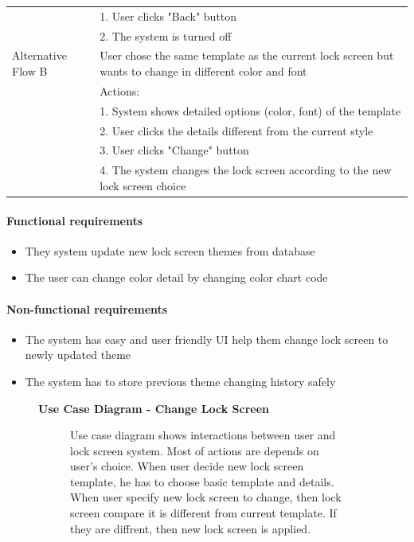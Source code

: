 \documentclass{article}
\begin{document}
\begin{table}[htbp]
\begin{tabularx}{\textwidth}{|>{\raggedright\arraybackslash}p{}|X|}
								 & 1. User clicks "Back" button \\
								 & 2. The system is turned off \\ \hline
				Alternative Flow B & User chose the same template as the current lock screen but wants to change in different color and font \\
								 & Actions: \\
								 & 1. System shows detailed options (color, font) of the template \\
								 & 2. User clicks the details different from the current style \\
								 & 3. User clicks "Change" button \\
								 & 4. The system changes the lock screen according to the new lock screen choice \\ \hline
			\end{tabularx}
		\end{table}
		\paragraph{Functional requirements}
		\begin{itemize}
			\item They system update new lock screen themes from database
			\item The user can change color detail by changing color chart code
		\end{itemize}
		
		\paragraph{Non-functional requirements}
		\begin{itemize}
			\item The system has easy and user friendly UI help them change lock screen to newly updated theme
			\item The system has to store previous theme changing history safely
		\end{itemize}
		\newpage
		
		\begin{figure}[htbp]
			\textbf{Use Case Diagram - Change Lock Screen}
			\centering
			\begin{subfigure}{\textwidth}
				\resizebox{\textwidth}{!}{}
			\end{subfigure}
			\begin{subfigure}{\textwidth}
				Use case diagram shows interactions between user and lock screen system. Most of actions are depends on user's choice. When user decide new lock screen template, he has to choose basic template and details. When user specify new lock screen to change, then lock screen compare it is different from current template. If they are diffrent, then new lock screen is applied.
			\end{subfigure}
		\end{figure}
		\clearpage
\end{document}
